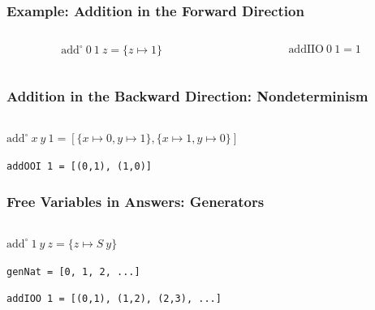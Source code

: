 \documentclass[xcolor={dvipsnames}, aspectratio=169]{beamer}
\begin{document}
\begin{frame}[fragile]
  \frametitle{Example: Addition in the Forward Direction}
\begin{columns}
  \begin{column}[t]{0.49\textwidth}
    
    \[ \text{add}^{\circ}\ 0\ 1\ z = \{z \mapsto 1\}\]
  \end{column}
  \begin{column}[t]{0.49\textwidth}
    
    \[ \text{addIIO}\ 0\ 1 = 1 \] 
  \end{column}
\end{columns}
\end{frame}


\begin{frame}[fragile]
  \frametitle{Addition in the Backward Direction: Nondeterminism}
\begin{columns}
  \begin{column}[t]{0.49\textwidth}
    
  \end{column}
  \begin{column}[t]{0.49\textwidth}
    
  \end{column}
\end{columns}

\vfill
$\text{add}^{\circ}\ x\ y\ 1 = \left[\{x \mapsto  0, y \mapsto  1\}, \{x \mapsto  1, y \mapsto  0\} \right]$

\vfill

\lstinline{addOOI 1 = [(0,1), (1,0)]}

\end{frame}

\begin{frame}[fragile]
  \frametitle{Free Variables in Answers: Generators}
\begin{columns}
  \begin{column}[t]{0.49\textwidth}
    

    \vspace{0.5cm}
    $\text{add}^{\circ}\ 1\ y\ z = \{z \mapsto S\ y\}$

    \vspace{0.5cm}

    \lstinline{genNat = [0, 1, 2, ...]}

    \vspace{0.5cm}

    \lstinline{addIOO 1 = [(0,1), (1,2), (2,3), ...]} 
  \end{column}
  \begin{column}[t]{0.49\textwidth}
    
  \end{column}
\end{columns}
\end{frame}
\end{document}
